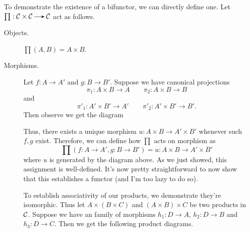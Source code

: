 \begin{prf}
    To demonstrate the existence of a bifunctor, we can directly
    define one. Let $\prod: \cc \times \cc \to \cc$ act as follows. 
    \begin{description}
        \item[Objects.] $\prod(A, B) = A \times B$.
        \item[Morphisms.] Let $f: A \to A'$ and $g: B \to B'$. Suppose
        we have canonical projections 
        \[
            \pi_1: A \times B \to A \qquad  \pi_2: A \times B \to B  
        \] 
        and 
        \[
            \pi'_1: A' \times B' \to A' \qquad  \pi'_2: A' \times B' \to  
            B'.
        \]
        Then observe we get the diagram
        \begin{center}
        \end{center}
        Thus, there exists a unique morphism $u: A \times B \to A'
        \times B'$ whenever such $f, g$ exist. Therefore, we can
        define how $\prod$ acts on morphism as
        \[
            \prod(f: A \to A', g: B \to B') = u: A \times B \to A' \times
            B'
        \]
        where $u$ is generated by the diagram above. As we just showed, 
        this assignment is well-defined.
        It's now pretty straightforward to now show that this establishes
        a functor (and I'm too lazy to do so). 

        To establish associativity of our products, we demonstrate
        they're  isomorphic. Thus let $A \times (B \times C)$ and $(A
        \times B) \times C$ be two products in $\mathcal{C}$. Suppose we have
        an family of morphisms $h_1: D \to A$, $h_2: D \to B$ and
        $h_3: D \to C$. Then we get the following product diagrams. 


\end{description}
\end{prf}
